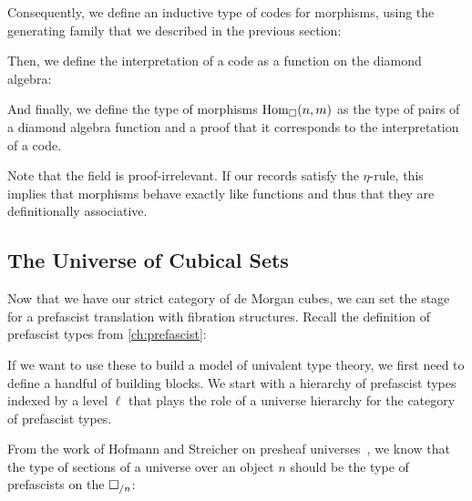 Consequently, we define an inductive type of codes for morphisms, using the
generating family that we described in the previous section: 


Then, we define the interpretation of a code as a function on the diamond
algebra:


And finally, we define the type of morphisms \( \hom[\catCube]{n}{m} \) as the 
type of pairs of a diamond algebra function and a proof that it corresponds to
the interpretation of a code.


Note that the field  is proof-irrelevant.
% 
If our records satisfy the \( \eta \)-rule, this implies that morphisms behave
exactly like functions and thus that they are definitionally associative.


\subsection{The Universe of Cubical Sets}

Now that we have our strict category of de Morgan cubes, we can set the stage 
for a prefascist translation with fibration structures. Recall the definition 
of prefascist types from \cref{ch:prefascist}:


If we want to use these to build a model of univalent type theory, we first 
need to define a handful of building blocks.
% 
We start with a hierarchy of prefascist types indexed by a level \( \ell \) 
that plays the role of a universe hierarchy for the category of prefascist types.
 
From the work of Hofmann and Streicher on presheaf 
universes~, we know that the type of sections of a 
universe over an object \( n \) should be the type of prefascists on the 
% 
% 
\( \catCube_{/n} \):

